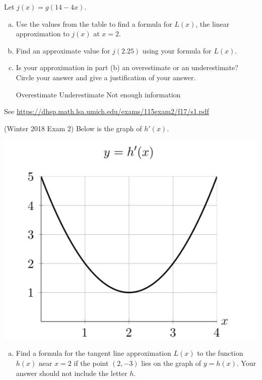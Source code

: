 \documentclass[11pt]{exam}
\begin{document}
\begin{questions}
\begin{center}
        \end{center}
Let $j(x) = g(14-4x)$.
\begin{enumerate}[(a)]
\item Use the values from the table to find a formula for $L(x)$, the linear approximation to $j(x)$ at $x = 2$.
\vspace{0.2in}
\item Find an approximate value for $j(2.25)$ using your formula for $L(x)$.
\vspace{0.2in}
\item Is your approximation in part (b) an overestimate or an underestimate? Circle your answer and give a justification of your answer.

\centering Overestimate \hspace{7mm} Underestimate \hspace{7mm} Not enough information 
\vspace{0.2in}
\end{enumerate}
\begin{solution}
  See \href{https://dhsp.math.lsa.umich.edu/exams/115exam2/f17/s1.pdf}{https://dhsp.math.lsa.umich.edu/exams/115exam2/f17/s1.pdf}
\end{solution}
\question (Winter 2018 Exam 2) %
Below is the graph of $h'(x)$.
\begin{center}
  \includegraphics[scale=0.4]{Exam2W2018Problem9}
\end{center}
\begin{enumerate}[(a)]
\item Find a formula for the tangent line approximation $L(x)$ to the function $h(x)$ near $x = 2$ if the point $(2,-3)$ lies on the graph of $y = h(x)$. Your answer should not include the letter $h$.

\end{enumerate}
\end{questions}
\end{document}
